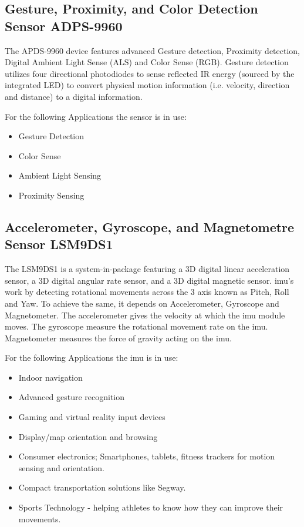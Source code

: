 \subsection{Gesture, Proximity, and Color Detection Sensor ADPS-9960}

The APDS-9960 device features advanced Gesture detection, Proximity detection, Digital Ambient Light Sense (ALS) and Color Sense (RGB). \cite{Arduino:2021} Gesture detection utilizes four directional photodiodes to sense reflected IR energy (sourced by the integrated LED) to convert physical motion information (i.e. velocity, direction and distance) to a digital information.

For the following Applications the sensor is in use:

\begin{itemize}
    \item Gesture Detection
    \item Color Sense
    \item Ambient Light Sensing
    \item Proximity Sensing
\end{itemize}

\subsection{Accelerometer, Gyroscope, and Magnetometre Sensor LSM9DS1}

The LSM9DS1 is a system-in-package featuring a 3D digital linear acceleration sensor, a 3D digital angular rate sensor, and a 3D digital magnetic sensor. \ac{imu}'s work by detecting rotational movements across the 3 axis known as Pitch, Roll and Yaw. To achieve the same, it depends on Accelerometer, Gyroscope and Magnetometer. The accelerometer gives the velocity at which the \ac{imu} module moves. The gyroscope measure the rotational movement rate on the \ac{imu}. Magnetometer measures the force of gravity acting on the \ac{imu}.

For the following Applications the \ac{imu} is in use:


\begin{itemize}
    \item Indoor navigation
    \item Advanced gesture recognition
    \item Gaming and virtual reality input devices
    \item Display/map orientation and browsing
    \item Consumer electronics; Smartphones, tablets, fitness trackers for motion sensing and orientation.
    \item Compact transportation solutions like Segway.
    \item Sports Technology - helping athletes to know how they can improve their movements.
\end{itemize}


